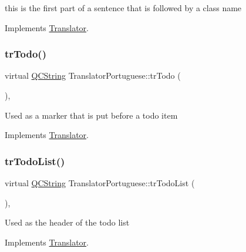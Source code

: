 this is the first part of a sentence that is followed by a class name 

Implements \mbox{\hyperlink{class_translator}{Translator}}.

\mbox{\label{class_translator_portuguese_a46ac2098ecd31776077a2569a9dea98c}} 
\subsubsection{\texorpdfstring{trTodo()}{trTodo()}}
{\footnotesize\ttfamily virtual \mbox{\hyperlink{class_q_c_string}{Q\+C\+String}} Translator\+Portuguese\+::tr\+Todo (\begin{DoxyParamCaption}{ }\end{DoxyParamCaption})\hspace{0.3cm}{\ttfamily [inline]}, {\ttfamily [virtual]}}

Used as a marker that is put before a todo item 

Implements \mbox{\hyperlink{class_translator}{Translator}}.

\mbox{\label{class_translator_portuguese_a43b46ba22ded4a4e5e310b54c8f3f974}} 
\subsubsection{\texorpdfstring{trTodoList()}{trTodoList()}}
{\footnotesize\ttfamily virtual \mbox{\hyperlink{class_q_c_string}{Q\+C\+String}} Translator\+Portuguese\+::tr\+Todo\+List (\begin{DoxyParamCaption}{ }\end{DoxyParamCaption})\hspace{0.3cm}{\ttfamily [inline]}, {\ttfamily [virtual]}}

Used as the header of the todo list 

Implements \mbox{\hyperlink{class_translator}{Translator}}.

\mbox{\label{class_translator_portuguese_a8bdd953afe7c5bead1ce64134c68f3dc}} 
